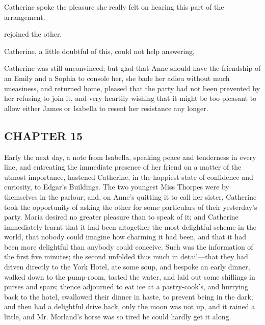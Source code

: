 Catherine spoke the pleasure she really felt on hearing this part of the arrangement.

 rejoined the other, 

Catherine, a little doubtful of this, could not help answering, 


Catherine was still unconvinced; but glad that Anne should have the friendship of an Emily and a Sophia to console her, she bade her adieu without much uneasiness, and returned home, pleased that the party had not been prevented by her refusing to join it, and very heartily wishing that it might be too pleasant to allow either James or Isabella to resent her resistance any longer.

\subsection[chapter-15]{\useURL[url17][][][]\from[url17]CHAPTER 15}

Early the next day, a note from Isabella, speaking peace and tenderness in every line, and entreating the immediate presence of her friend on a matter of the utmost importance, hastened Catherine, in the happiest state of confidence and curiosity, to Edgar's Buildings. The two youngest Miss Thorpes were by themselves in the parlour; and, on Anne's quitting it to call her sister, Catherine took the opportunity of asking the other for some particulars of their yesterday's party. Maria desired no greater pleasure than to speak of it; and Catherine immediately learnt that it had been altogether the most delightful scheme in the world, that nobody could imagine how charming it had been, and that it had been more delightful than anybody could conceive. Such was the information of the first five minutes; the second unfolded thus much in detail---that they had driven directly to the York Hotel, ate some soup, and bespoke an early dinner, walked down to the pump-room, tasted the water, and laid out some shillings in purses and spars; thence adjourned to eat ice at a pastry-cook's, and hurrying back to the hotel, swallowed their dinner in haste, to prevent being in the dark; and then had a delightful drive back, only the moon was not up, and it rained a little, and Mr. Morland's horse was so tired he could hardly get it along.

